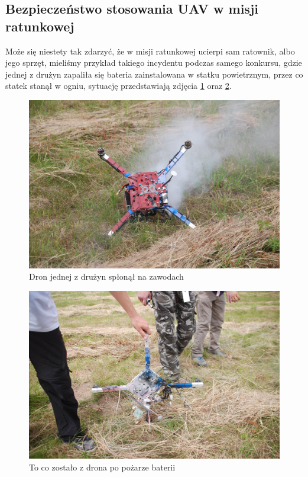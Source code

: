 \subsection{Bezpieczeństwo stosowania UAV w misji ratunkowej}
Może się niestety tak zdarzyć, że w misji ratunkowej ucierpi sam ratownik, albo jego sprzęt, mieliśmy przykład takiego incydentu podczas samego konkursu, gdzie jednej z drużyn zapaliła się bateria zainstalowana w statku powietrznym, przez co statek stanął w ogniu, sytuację przedstawiają zdjęcia \ref{fig:ploniedron1} oraz \ref{fig:ploniedron2}.

\begin{figure}[!th]
    \centering
    \includegraphics[width=15cm]{zalaczniki/obrazy/ploniedron1.jpg}
    \caption{Dron jednej z drużyn spłonął na zawodach}
    \label{fig:ploniedron1}
\end{figure}

\begin{figure}[!th]
    \centering
    \includegraphics[width=15cm]{zalaczniki/obrazy/ploniedron2.jpg}
    \caption{To co zostało z drona po pożarze baterii}
    \label{fig:ploniedron2}
\end{figure}

